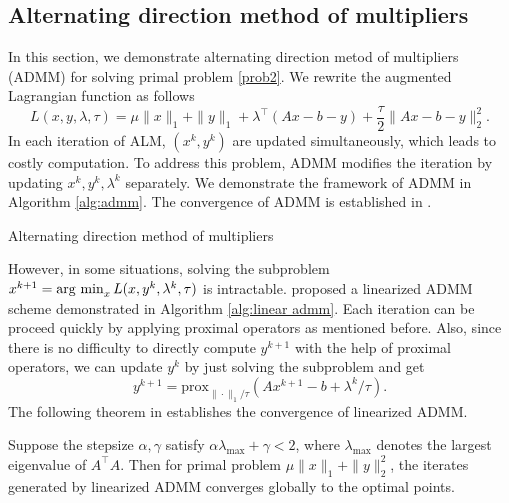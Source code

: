 \documentclass{article}
\newcommand{\prox}{\mathrm{prox}}
\begin{document}
\subsection{Alternating direction method of multipliers}
In this section, we demonstrate alternating direction metod of multipliers (ADMM) for solving primal problem \eqref{prob2}. We rewrite the augmented Lagrangian function as follows
\begin{equation}\label{eq:al}
	L(x,y,\lambda,\tau)=\mu\|x\|_1+\|y\|_1+\lambda^\top(Ax-b-y)+\frac{\tau}{2}\|Ax-b-y\|_2^2.
\end{equation}
In each iteration of ALM, $(x^k,y^k)$ are updated simultaneously, which leads to costly computation. To address this problem, ADMM modifies the iteration by updating $x^k,y^k,\lambda^k$ separately. We demonstrate the framework of ADMM in Algorithm \ref{alg:admm}. The convergence of ADMM is established in \cite{glowinski1989augmented}.
\begin{algorithm}[H]
\caption{Alternating direction method of multipliers}
\begin{algorithmic}[1]\label{alg:admm}
\ENDWHILE
{}
\end{algorithmic}
\end{algorithm}
However, in some situations, solving the subproblem $x^{k+1}=\operatorname{arg~min}_xL(x,y^k,\lambda^k,\tau)$ is intractable. \cite{yang2011alternating} proposed a linearized ADMM scheme demonstrated in Algorithm \ref{alg:linear admm}. Each iteration can be proceed quickly by applying proximal operators as mentioned before. Also, since there is no difficulty to directly compute $y^{k+1}$ with the help of proximal operators, we can update $y^k$ by just solving the subproblem and get
\begin{equation}
	y^{k+1} = \prox_{\|\cdot\|_1/\tau}(Ax^{k+1}-b+\lambda^k/\tau).
\end{equation}
 The following theorem in \cite{yang2011alternating} establishes the convergence of linearized ADMM.
\begin{theorem}
Suppose the stepsize $\alpha,\gamma$ satisfy $\alpha\lambda_{\max}+\gamma<2$, where $\lambda_{\max}$ denotes the largest eigenvalue of $A^\top A$. Then for primal problem $\mu\|x\|_1+\|y\|_2^2$, the iterates generated by linearized ADMM converges globally to the optimal points.
\end{theorem}
\end{document}
